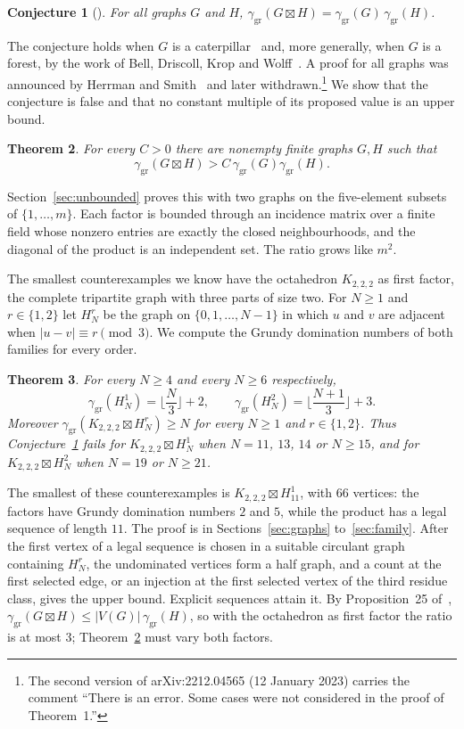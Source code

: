 \documentclass[11pt,a4paper,reqno]{amsart}
\newtheorem{theorem}{Theorem}[section]
\newtheorem{conjecture}[theorem]{Conjecture}
\theoremstyle{definition}
\theoremstyle{remark}
\numberwithin{equation}{section}
\newcommand{\ggr}{\gamma_{\mathrm{gr}}}
\newcommand{\sprod}{\boxtimes}
\newcommand{\oct}{K_{2,2,2}}
\begin{document}
\begin{conjecture}[{\cite[Conjecture~22]{BBG}}]\label{conj}
For all graphs $G$ and $H$, $\ggr(G\sprod H)=\ggr(G)\,\ggr(H)$.
\end{conjecture}

The conjecture holds when $G$ is a caterpillar~\cite{BBG} and, more generally, when $G$ is a forest, by the work of Bell, Driscoll, Krop and Wolff~\cite{BDKW}. A proof for all graphs was announced by Herrman and Smith~\cite{HS} and later withdrawn.\footnote{The second version of arXiv:2212.04565 (12 January 2023) carries the comment ``There is an error. Some cases were not considered in the proof of Theorem~1.''} We show that the conjecture is false and that no constant multiple of its proposed value is an upper bound.

\begin{theorem}\label{thm:unbounded}
For every $C>0$ there are nonempty finite graphs $G,H$ such that
\[
 \ggr(G\sprod H)>C\,\ggr(G)\ggr(H).
\]
\end{theorem}

Section~\ref{sec:unbounded} proves this with two graphs on the five-element subsets of $\{1,\dots,m\}$. Each factor is bounded through an incidence matrix over a finite field whose nonzero entries are exactly the closed neighbourhoods, and the diagonal of the product is an independent set. The ratio grows like $m^2$.

The smallest counterexamples we know have the octahedron $\oct$ as first factor, the complete tripartite graph with three parts of size two. For $N\ge1$ and $r\in\{1,2\}$ let $H^r_N$ be the graph on $\{0,1,\dots,N-1\}$ in which $u$ and $v$ are adjacent when $|u-v|\equiv r\pmod 3$. We compute the Grundy domination numbers of both families for every order.

\begin{theorem}\label{thm:family}
For every $N\ge4$ and every $N\ge6$ respectively,
\[
 \ggr(H^1_N)=\Big\lfloor\frac{N}{3}\Big\rfloor+2,\qquad
 \ggr(H^2_N)=\Big\lfloor\frac{N+1}{3}\Big\rfloor+3.
\]
Moreover $\ggr(\oct\sprod H^r_N)\ge N$ for every $N\ge1$ and $r\in\{1,2\}$. Thus Conjecture~\ref{conj} fails for $\oct\sprod H^1_N$ when $N=11$, $13$, $14$ or $N\ge15$, and for $\oct\sprod H^2_N$ when $N=19$ or $N\ge21$.
\end{theorem}

The smallest of these counterexamples is $\oct\sprod H^1_{11}$, with $66$ vertices: the factors have Grundy domination numbers $2$ and $5$, while the product has a legal sequence of length $11$. The proof is in Sections~\ref{sec:graphs} to~\ref{sec:family}. After the first vertex of a legal sequence is chosen in a suitable circulant graph containing $H^r_N$, the undominated vertices form a half graph, and a count at the first selected edge, or an injection at the first selected vertex of the third residue class, gives the upper bound. Explicit sequences attain it. By Proposition~25 of~\cite{BBG}, $\ggr(G\sprod H)\le|V(G)|\,\ggr(H)$, so with the octahedron as first factor the ratio is at most $3$; Theorem~\ref{thm:unbounded} must vary both factors.
\end{document}
